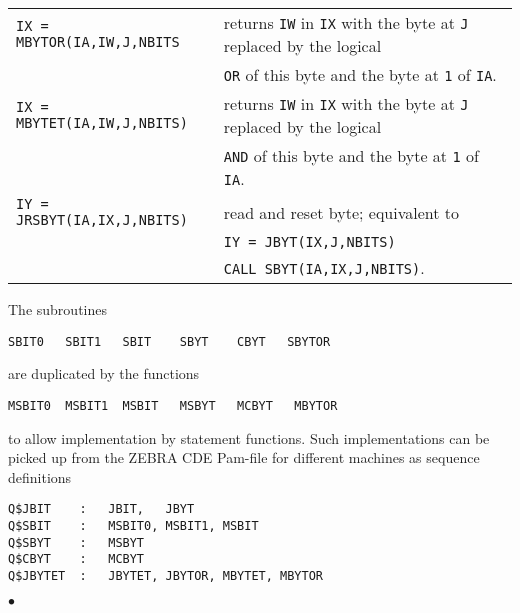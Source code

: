 \documentclass[]{cernman}
\providecommand{\Writekeys}{}
\begin{document}
\begin{tabular}{@{\hspace*{3mm}}ll}
{\tt IX = MBYTOR(IA,IW,J,NBITS}
& returns {\tt IW} in {\tt IX} with the byte at {\tt J} replaced by the
logical \\
& {\tt OR} of this byte and the byte at {\tt 1} of {\tt IA}. \\
{\tt IX = MBYTET(IA,IW,J,NBITS)}
& returns {\tt IW} in {\tt IX} with the byte at {\tt J} replaced by the
logical \\
& {\tt AND} of this byte and the byte at {\tt 1} of {\tt IA}. \\
{\tt IY = JRSBYT(IA,IX,J,NBITS)}
& read and reset byte; equivalent to \\
& {\tt IY = JBYT(IX,J,NBITS)} \\
& {\tt CALL SBYT(IA,IX,J,NBITS)}. \\
\end{tabular}
\Notes
The subroutines
\begin{verbatim}
SBIT0   SBIT1   SBIT    SBYT    CBYT   SBYTOR
\end{verbatim}
are duplicated by the functions
\begin{verbatim}
MSBIT0  MSBIT1  MSBIT   MSBYT   MCBYT   MBYTOR
\end{verbatim}
to allow implementation by statement functions.
Such implementations can be picked up from the ZEBRA CDE Pam-file for
different machines as sequence definitions
\begin{verbatim}
Q$JBIT    :   JBIT,   JBYT
Q$SBIT    :   MSBIT0, MSBIT1, MSBIT
Q$SBYT    :   MSBYT
Q$CBYT    :   MCBYT
Q$JBYTET  :   JBYTET, JBYTOR, MBYTET, MBYTOR
\end{verbatim}
$\bullet$
\Writekeys
\end{document}
